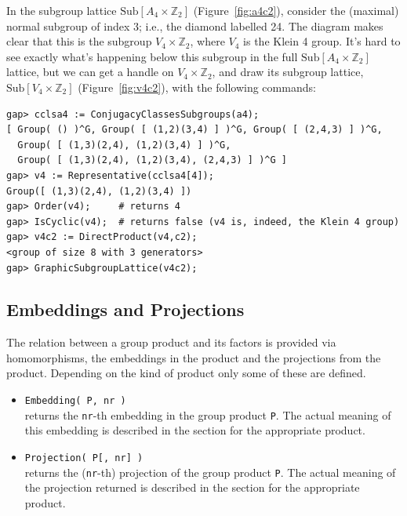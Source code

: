 \documentclass[11pt]{amsart}
\theoremstyle{plain}
\newcommand{\subsectionspace}{~\\[-6pt]}
\newcommand{\codesize}{\footnotesize}
\newcommand{\<}{\ensuremath{\langle}}
\renewcommand{\>}{\ensuremath{\rangle}}
\newcommand{\Sub}{\ensuremath{\mathrm{Sub}}}
\newcommand{\Z}{\ensuremath{\mathbb{Z}}}
\begin{document}
\begin{enumerate}
\noindent In the subgroup lattice $\Sub[A_4 \times \Z_2]$ (Figure~\ref{fig:a4c2}), 
consider the (maximal) normal subgroup of index 3; 
i.e., the diamond labelled 24.  
The diagram makes clear that this is the subgroup 
$V_4 \times \Z_2$, where $V_4$ is the Klein 4 group.  
It's hard to see exactly what's happening below this subgroup in the full 
$\Sub[A_4 \times \Z_2]$ lattice,
but we can get a handle on $V_4 \times \Z_2$, and draw its subgroup lattice, 
$\Sub[V_4 \times \Z_2]$ (Figure~\ref{fig:v4c2}), with the following commands:
{\codesize
\begin{verbatim}
gap> cclsa4 := ConjugacyClassesSubgroups(a4);
[ Group( () )^G, Group( [ (1,2)(3,4) ] )^G, Group( [ (2,4,3) ] )^G, 
  Group( [ (1,3)(2,4), (1,2)(3,4) ] )^G, 
  Group( [ (1,3)(2,4), (1,2)(3,4), (2,4,3) ] )^G ]
gap> v4 := Representative(cclsa4[4]);
Group([ (1,3)(2,4), (1,2)(3,4) ])
gap> Order(v4);     # returns 4 
gap> IsCyclic(v4);  # returns false (v4 is, indeed, the Klein 4 group)
gap> v4c2 := DirectProduct(v4,c2);
<group of size 8 with 3 generators>
gap> GraphicSubgroupLattice(v4c2);
\end{verbatim}}
\end{enumerate}



\newpage


\newpage 

\subsection{Embeddings and Projections}
\label{sec:embedd-proj-group}
The relation between a group product and its factors is provided via homomorphisms, the embeddings in
the product and the projections from the product. Depending on the kind of product only some of these are
defined.
\begin{itemize}
\item {\tt Embedding( P, nr )}\\[2pt]
returns the {\tt nr}-th embedding in the group product {\tt P}. 
The actual meaning of this embedding is described in the section for the appropriate product.
\item {\tt Projection( P[, nr] )}\\[2pt]
returns the ({\tt nr}-th) projection of the group product {\tt P}. 
The actual meaning of the projection returned is described in the section for the appropriate product.
\end{itemize}
\subsectionspace
\end{document}
